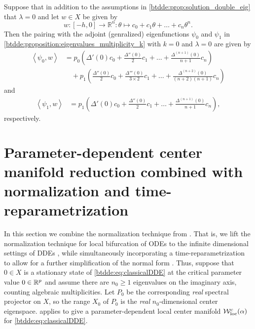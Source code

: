\begin{lemma}
\label{btdde:lemma:pairing_with_adjoint_eigenfunctions}
Suppose that in addition to the assumptions in \cref{btdde:prop:solution_double_eig} that $\lambda = 0$ and
let $w\in X$ be given by
\[
    w \colon [-h,0] \rightarrow \mathbb R^n 
      \colon \theta \mapsto c_0 + c_1 \theta + \dots + c_n \theta^n.
\]
Then the pairing with the adjoint (genralized) eigenfunctions $\psi_0$ and
$\psi_1$ in \cref{btdde:proposition:eigenvalues_multiplicity_k} with $k=0$ and
$\lambda=0$ are given by
\begin{align*}
    \left< \psi_0, w \right> &=
    p_0 \left( \Delta'(0) c_0 + \frac{\Delta''(0)}2 c_1 + \dots + \frac{\Delta^{(n + 1)}(0)}{n + 1} c_n \right) \\
    & \quad + p_1 \left( \frac{\Delta''(0)}{2} c_0 + 
        \frac{\Delta'''(0)}{3\times 2} c_1 + \dots + \frac{\Delta^{(n + 2)}(0)}{(n + 2)(n + 1)} c_n \right)
\end{align*}
and
\begin{align*}
    \left< \psi_1, w \right> &=
    p_1 \left( \Delta'(0) c_0 + \frac{\Delta''(0)}2 c_1 + \dots + \frac{\Delta^{(n + 1)}(0)}{n + 1} c_n \right),
\end{align*}
respectively.
\end{lemma}


\section{Parameter-dependent center manifold reduction combined with normalization and time-reparametrization}
\label{btdde:sec:Center_manifold_reduction}

In this section we combine the normalization technique from
\cite{Bosschaert@Interplay,Switching2019}. That is, we lift the normalization technique
for local bifurcation of ODEs to the infinite dimensional settings of DDEs
\cite{Switching2019}, while simultaneously incorporating a time-reparametrization 
to allow for a further simplification of the normal form \cite{Bosschaert@Interplay}.
Thus, suppose that $0 \in X$ is a stationary state of \cref{btdde:eq:classicalDDE} at the
critical parameter value $0 \in \mathbb{R}^p$ and assume there are $n_0 \ge 1$
eigenvalues on the imaginary axis, counting algebraic multiplicities. Let $P_0$
be the corresponding \emph{real} spectral projector on $X$, so the range $X_0$
of $P_0$ is the \emph{real} $n_0$-dimensional center eigenspace.
\cite[Corollary 20]{Switching2019}  applies to give a parameter-dependent local
center manifold $\mathcal{W}^c_{\text{loc}}(\alpha)$ for \cref{btdde:eq:classicalDDE}.

